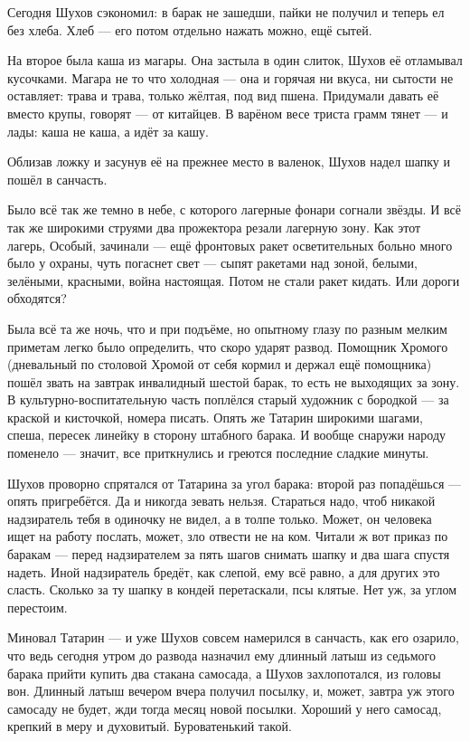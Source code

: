 Сегодня Шухов сэкономил: в барак не зашедши, пайки не получил и теперь ел без хлеба. Хлеб ---
его потом отдельно нажать можно, ещё сытей.

На второе была каша из магары. Она застыла в один слиток, Шухов её отламывал кусочками.
Магара не то что холодная --- она и горячая ни вкуса, ни сытости не оставляет: трава и трава,
только жёлтая, под вид пшена. Придумали давать её вместо крупы, говорят --- от китайцев. В
варёном весе триста грамм тянет --- и лады: каша не каша, а идёт за кашу.

Облизав ложку и засунув её на прежнее место в валенок, Шухов надел шапку и пошёл в санчасть.

Было всё так же темно в небе, с которого лагерные фонари согнали звёзды. И всё так же широкими
струями два прожектора резали лагерную зону. Как этот лагерь, Особый, зачинали --- ещё
фронтовых ракет осветительных больно много было у охраны, чуть погаснет свет --- сыпят
ракетами над зоной, белыми, зелёными, красными, война настоящая. Потом не стали ракет кидать.
Или дороги обходятся?

Была всё та же ночь, что и при подъёме, но опытному глазу по разным мелким приметам легко было
определить, что скоро ударят развод. Помощник Хромого (дневальный по столовой Хромой от себя
кормил и держал ещё помощника) пошёл звать на завтрак инвалидный шестой барак, то есть не
выходящих за зону. В культурно-воспитательную часть поплёлся старый художник с бородкой ---
за краской и кисточкой, номера писать. Опять же Татарин широкими шагами, спеша, пересек
линейку в сторону штабного барака. И вообще снаружи народу поменело --- значит, все
приткнулись и греются последние сладкие минуты.

Шухов проворно спрятался от Татарина за угол барака: второй раз попадёшься --- опять
пригребётся. Да и никогда зевать нельзя. Стараться надо, чтоб никакой надзиратель тебя в
одиночку не видел, а в толпе только. Может, он человека ищет на работу послать, может, зло
отвести не на ком. Читали ж вот приказ по баракам --- перед надзирателем за пять шагов снимать
шапку и два шага спустя надеть. Иной надзиратель бредёт, как слепой, ему всё равно, а для
других это сласть. Сколько за ту шапку в кондей перетаскали, псы клятые. Нет уж, за углом
перестоим.

Миновал Татарин --- и уже Шухов совсем намерился в санчасть, как его озарило, что ведь сегодня
утром до развода назначил ему длинный латыш из седьмого барака прийти купить два стакана
самосада, а Шухов захлопотался, из головы вон. Длинный латыш вечером вчера получил посылку,
и, может, завтра уж этого самосаду не будет, жди тогда месяц новой посылки. Хороший у него
самосад, крепкий в меру и духовитый. Буроватенький такой.

